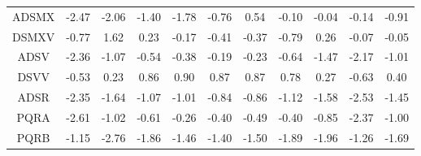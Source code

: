 \begin{longtable}{ | c || c | c | c | c | c | c | c | c | c || c |}
ADSMX &  \cellcolor[HTML]{FFBFBF} -2.47 &  \cellcolor[HTML]{FFCFCF} -2.06 &  \cellcolor[HTML]{FFDFDF} -1.40 &  \cellcolor[HTML]{FFCFCF} -1.78 &  \cellcolor[HTML]{FFEFEF} -0.76 &  \cellcolor[HTML]{EFEFFF} 0.54 &  \cellcolor[HTML]{FFFFFF} -0.10 &  \cellcolor[HTML]{FFFFFF} -0.04 &  \cellcolor[HTML]{FFFFFF} -0.14 &  \cellcolor[HTML]{FFE7E7} -0.91 \\
DSMXV &  \cellcolor[HTML]{FFEFEF} -0.77 &  \cellcolor[HTML]{D7D7FF} 1.62 &  \cellcolor[HTML]{F7F7FF} 0.23 &  \cellcolor[HTML]{FFF7F7} -0.17 &  \cellcolor[HTML]{FFF7F7} -0.41 &  \cellcolor[HTML]{FFF7F7} -0.37 &  \cellcolor[HTML]{FFEFEF} -0.79 &  \cellcolor[HTML]{F7F7FF} 0.26 &  \cellcolor[HTML]{FFFFFF} -0.07 &  \cellcolor[HTML]{FFFFFF} -0.05 \\
ADSV &  \cellcolor[HTML]{FFC7C7} -2.36 &  \cellcolor[HTML]{FFE7E7} -1.07 &  \cellcolor[HTML]{FFEFEF} -0.54 &  \cellcolor[HTML]{FFF7F7} -0.38 &  \cellcolor[HTML]{FFF7F7} -0.19 &  \cellcolor[HTML]{FFF7F7} -0.23 &  \cellcolor[HTML]{FFEFEF} -0.64 &  \cellcolor[HTML]{FFD7D7} -1.47 &  \cellcolor[HTML]{FFC7C7} -2.17 &  \cellcolor[HTML]{FFE7E7} -1.01 \\
DSVV &  \cellcolor[HTML]{FFEFEF} -0.53 &  \cellcolor[HTML]{F7F7FF} 0.23 &  \cellcolor[HTML]{E7E7FF} 0.86 &  \cellcolor[HTML]{E7E7FF} 0.90 &  \cellcolor[HTML]{E7E7FF} 0.87 &  \cellcolor[HTML]{E7E7FF} 0.87 &  \cellcolor[HTML]{EFEFFF} 0.78 &  \cellcolor[HTML]{F7F7FF} 0.27 &  \cellcolor[HTML]{FFEFEF} -0.63 &  \cellcolor[HTML]{F7F7FF} 0.40 \\
ADSR &  \cellcolor[HTML]{FFC7C7} -2.35 &  \cellcolor[HTML]{FFD7D7} -1.64 &  \cellcolor[HTML]{FFE7E7} -1.07 &  \cellcolor[HTML]{FFE7E7} -1.01 &  \cellcolor[HTML]{FFE7E7} -0.84 &  \cellcolor[HTML]{FFE7E7} -0.86 &  \cellcolor[HTML]{FFDFDF} -1.12 &  \cellcolor[HTML]{FFD7D7} -1.58 &  \cellcolor[HTML]{FFBFBF} -2.53 &  \cellcolor[HTML]{FFD7D7} -1.45 \\
PQRA &  \cellcolor[HTML]{FFBFBF} -2.61 &  \cellcolor[HTML]{FFE7E7} -1.02 &  \cellcolor[HTML]{FFEFEF} -0.61 &  \cellcolor[HTML]{FFF7F7} -0.26 &  \cellcolor[HTML]{FFF7F7} -0.40 &  \cellcolor[HTML]{FFEFEF} -0.49 &  \cellcolor[HTML]{FFF7F7} -0.40 &  \cellcolor[HTML]{FFE7E7} -0.85 &  \cellcolor[HTML]{FFC7C7} -2.37 &  \cellcolor[HTML]{FFE7E7} -1.00 \\
PQRB &  \cellcolor[HTML]{FFDFDF} -1.15 &  \cellcolor[HTML]{FFB7B7} -2.76 &  \cellcolor[HTML]{FFCFCF} -1.86 &  \cellcolor[HTML]{FFD7D7} -1.46 &  \cellcolor[HTML]{FFDFDF} -1.40 &  \cellcolor[HTML]{FFD7D7} -1.50 &  \cellcolor[HTML]{FFCFCF} -1.89 &  \cellcolor[HTML]{FFCFCF} -1.96 &  \cellcolor[HTML]{FFDFDF} -1.26 &  \cellcolor[HTML]{FFD7D7} -1.69 \\

\end{longtable}
